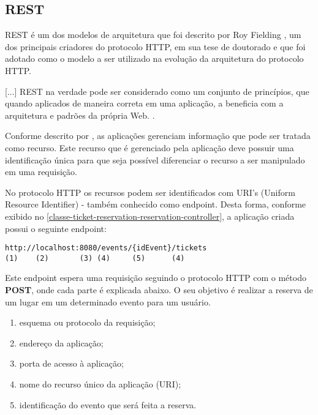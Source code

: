 \subsection{REST}\label{rest}

\begin{citacao}

REST é um dos modelos de arquitetura que foi descrito por
Roy Fielding \cite[5]{rest-roy-thomas-fielding},
um dos principais criadores do protocolo HTTP, em sua tese de doutorado
e que foi adotado como o modelo a ser utilizado na evolução da arquitetura
do protocolo HTTP.

[...] REST na verdade pode ser considerado como um conjunto de princípios,
que quando aplicados de maneira correta em uma aplicação, a beneficia com a
arquitetura e padrões da própria Web. \cite{rest-principios-e-boas-praticas}.

\end{citacao}

Conforme descrito por \cite{rest-principios-e-boas-praticas}, as aplicações
gerenciam informação que pode ser tratada como recurso. Este recurso que é
gerenciado pela aplicação deve possuir uma identificação única para que seja
possível diferenciar o recurso a ser manipulado em uma requisição.

No protocolo HTTP os recursos podem ser identificados com
URI's (Uniform Resource Identifier) - também conhecido como endpoint.
Desta forma, conforme exibido no \autoref{classe-ticket-reservation-reservation-controller},
a aplicação criada possui o seguinte endpoint:

\begin{minipage}{\linewidth}
\begin{lstlisting}[basicstyle=\ttfamily]
http://localhost:8080/events/{idEvent}/tickets
(1)    (2)       (3) (4)     (5)      (4)
\end{lstlisting}
\end{minipage}

Este endpoint espera uma requisição seguindo o protocolo HTTP
com o método \textbf{POST}, onde cada parte é explicada abaixo. O seu objetivo é
realizar a reserva de um lugar em um determinado evento para um usuário.

\begin{enumerate}

  \item esquema ou protocolo da requisição;

  \item endereço da aplicação;

  \item porta de acesso à aplicação;

  \item nome do recurso único da aplicação (URI);

  \item identificação do evento que será feita a reserva.

\end{enumerate}

